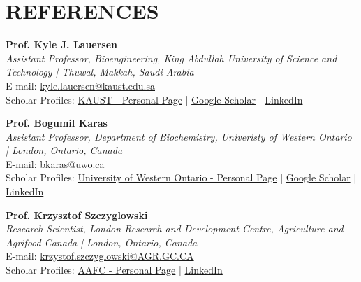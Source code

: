 \documentclass[a4paper,9pt]{extarticle}
\begin{document}
\section*{REFERENCES}
\begin{minipage}{1\textwidth}
\setlength{\parindent}{15pt} %
	\noindent
	\textbf{Prof. Kyle J. Lauersen}\\
	\textit{Assistant Professor, Bioengineering, King Abdullah University of Science and Technology | Thuwal, Makkah, Saudi Arabia}\\
	E-mail: \href{mailto:kyle.lauersen@kaust.edu.sa}{kyle.lauersen@kaust.edu.sa}\\
	Scholar Profiles: \href{https://www.kaust.edu.sa/en/study/faculty/kyle-j-lauersen}{KAUST - Personal Page} | \href{https://scholar.google.com/citations?user=IvP8gI8AAAAJ&hl=en}{Google Scholar} | \href{https://www.linkedin.com/in/kylejlauersen/}{LinkedIn}\\
	\end{minipage}
\begin{minipage}{1\textwidth}
\setlength{\parindent}{15pt} %
	\noindent
	\textbf{Prof. Bogumil Karas}\\
	\textit{Assistant Professor, Department of Biochemistry, Univeristy of Western Ontario | London, Ontario, Canada}\\
	E-mail: \href{mailto:bkaras@uwo.ca}{bkaras@uwo.ca}\\
	Scholar Profiles: \href{https://www.schulich.uwo.ca/biochem//people/faculty/Karas.html}{University of Western Ontario - Personal Page} | \href{https://scholar.google.com/citations?user=b58zresAAAAJ&hl=en}{Google Scholar} | \href{https://www.linkedin.com/in/bogumil-j-karas-77222913/}{LinkedIn}\\ 
\end{minipage}
\begin{minipage}{1\textwidth}
\setlength{\parindent}{15pt} %
	\noindent
	\textbf{Prof. Krzysztof Szczyglowski}\\
	\textit{Research Scientist, London Research and Development Centre, Agriculture and Agrifood Canada | London, Ontario, Canada}\\
	E-mail: \href{mailto:krzystof.szczyglowski@AGR.GC.CA}{krzystof.szczyglowski@AGR.GC.CA}\\
	Scholar Profiles: \href{https://www.goc411.ca/en/7381/Krzysztof-Szczyglowski}{AAFC - Personal Page} | \href{https://www.linkedin.com/in/krzysztof-szczyglowski-28197552/}{LinkedIn}\\ 
\end{minipage}
\end{document}

